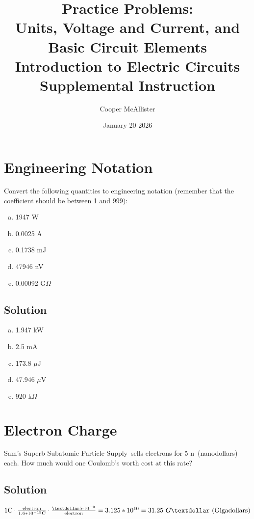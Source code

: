 \documentclass{article}
\title{Practice Problems: \\ Units, Voltage and Current, and Basic Circuit Elements \\  \large Introduction to Electric Circuits \\ Supplemental Instruction}
\author{Cooper McAllister}
\date{January 20 2026}
\begin{document}
 {
	\fancyhf{}
	\renewcommand{\headrulewidth}{0pt}
	\renewcommand{\footrulewidth}{0.4pt}
	\fancyfoot[R]{\thepage}
}
\pagestyle{footerstyle}
\maketitle
\thispagestyle{footerstyle}

\section{Engineering Notation}
Convert the following quantities to engineering notation (remember that the coefficient should be between 1 and 999):
\begin{enumerate}[(a)]
\item 1947 W
\item 0.0025 A
\item 0.1738 mJ
\item 47946 nV
\item 0.00092 G$\Omega$
\end{enumerate}
\subsection*{Solution}
\begin{enumerate}[(a)]
\item 1.947 kW
\item 2.5 mA
\item 173.8 $\mu$J
\item 47.946 $\mu$V
\item 920 k$\Omega$
\end{enumerate}

\section{Electron Charge}
Sam's Superb Subatomic Particle Supply\texttrademark \  sells electrons for 5 n\textdollar \ (nanodollars) each. How much would one Coulomb's worth cost at this rate?
\subsection*{Solution}
$1 \textrm{C} \cdot \frac{\textrm{electron}}{1.6*10^{-19} \textrm{C}} \cdot \frac{\textdollar 5\cdot 10^{-9}}{\textrm{electron}} = 3.125*10^{10} = 31.25 \ G\textdollar \ \textrm{(Gigadollars)}$
\end{document}
